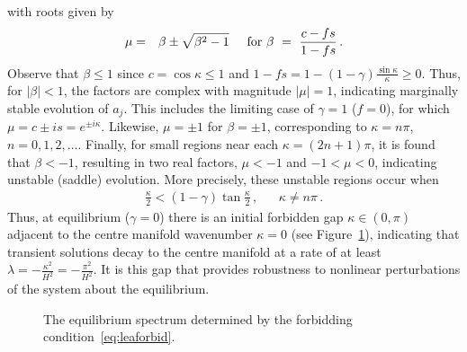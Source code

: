 \documentclass[12pt,a5paper]{article}
\begin{document}
with roots given by
\begin{eqnarray}
\mu & = & \beta\pm\sqrt{\beta^2-1}
\hspace*{5mm}\mbox{for } 
\beta~=~\frac{c-fs}{1-fs}\,.
\end{eqnarray}
Observe that $\beta\le 1$ since $c=\cos\kappa\le 1$ and 
$1-fs=1-(1-\gamma)\frac{\sin\kappa}{\kappa}\ge 0$.
Thus, for $|\beta|<1$, the factors are complex with magnitude 
$|\mu|=1$,
indicating marginally stable evolution of $a_j$. 
This includes the limiting case of $\gamma=1$ ($f=0$), for which
$\mu=c\pm is=e^{\pm i\kappa}$.
Likewise, $\mu=\pm 1$ for $\beta=\pm 1$, corresponding to $\kappa=n\pi$, $n=0,1,2,\ldots$.
Finally, for small regions near each $\kappa=(2n+1)\pi$, 
it is found that $\beta<-1$, resulting in two real factors,
$\mu<-1$ and $-1<\mu<0$, indicating unstable (saddle) evolution.
More precisely, these unstable regions occur when
\begin{eqnarray}
\frac{\kappa}{2} <(1-\gamma)\tan\frac{\kappa}{2}\,, && \kappa\ne n\pi\,.
\label{eq:leaforbid}
\end{eqnarray}
Thus, at equilibrium ($\gamma=0$) there is an initial forbidden gap $\kappa\in(0,\pi)$ adjacent to the centre manifold
wavenumber $\kappa=0$ (see Figure~\ref{fig:leaspec}), indicating that transient solutions decay to the centre manifold at a rate of at least
$\lambda=-\frac{\kappa^2}{H^2}=-\frac{\pi^2}{H^2}$. It is this gap that provides robustness to nonlinear perturbations
of the system about the equilibrium.

\begin{figure}[hbt]
\centering
{}
\caption{The equilibrium spectrum determined by the forbidding condition~\eqref{eq:leaforbid}.}
\label{fig:leaspec}
\end{figure}
\end{document}
